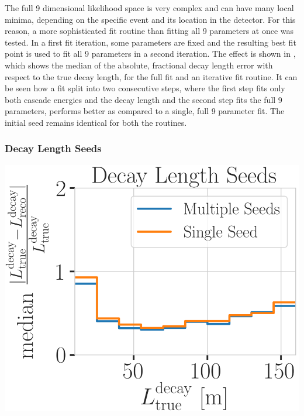 The full 9 dimensional likelihood space is very complex and can have many local minima, depending on the specific event and its location in the detector. For this reason, a more sophisticated fit routine than fitting all 9 parameters at once was tested. In a first fit iteration, some parameters are fixed and the resulting best fit point is used to fit all 9 parameters in a second iteration. The effect is shown in , which shows the median of the absolute, fractional decay length error with respect to the true decay length, for the full fit and an iterative fit routine. It can be seen how a fit split into two consecutive steps, where the first step fits only both cascade energies and the decay length and the second step fits the full 9 parameters, performs better as compared to a single, full 9 parameter fit. The initial seed remains identical for both the routines.


\subsubsection{Decay Length Seeds}

\begin{marginfigure}
	\centering
    \includegraphics{figures/results/190605_reco_optimization/decay_length_seeding_median_decay_length_resolution_Good + L7 + reco E1,E2 above 3_fix_y_new.png}
    \caption[Decay length resolutions to optimize length seeding]{Decay length resolution as a function of the true decay length, comparing the same fit routine seeded with just the seed decay length and seeded with a decay length of \SI{5}{\meter}, \SI{25}{\meter}, \SI{50}{\meter}, \SI{100}{\meter}, and \SI{200}{\meter} on the left.}
\end{marginfigure}

